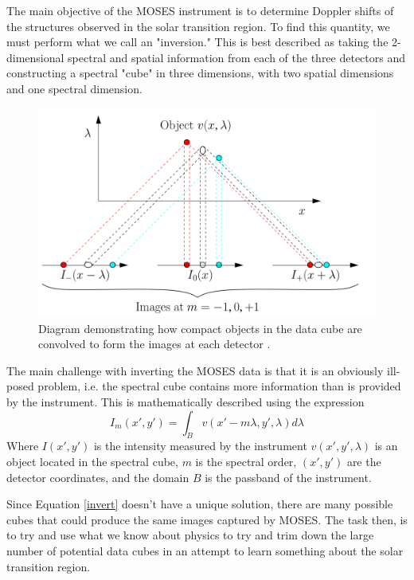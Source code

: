 \documentclass[twoside]{article}
\begin{document}
\begin{multicols}{2}
\begin{figure}[H]
\end{figure}
The main objective of the MOSES instrument is to determine Doppler shifts of the structures observed in the solar transition region. To find this quantity, we must perform what we call an "inversion." This is best described as taking the 2-dimensional spectral and spatial information from each of the three detectors and constructing a spectral "cube" in three dimensions, with two spatial dimensions and one spectral dimension.
\begin{figure}[H]
	\includegraphics[width=\linewidth]{images/inversion}
	\caption{Diagram demonstrating how compact objects in the data cube are convolved to form the images at each detector \cite{moses}.}
\end{figure}
The main challenge with inverting the MOSES data is that it is an obviously ill-posed problem, i.e. the spectral cube contains more information than is provided by the instrument. This is mathematically described using the expression
\begin{equation}
I_m(x',y') = \int_B v(x'-m \lambda,y',\lambda)d\lambda \label{invert}
\end{equation}
Where $I(x',y')$ is the intensity measured by the instrument $v(x',y',\lambda)$ is an object located in the spectral cube, $m$ is the spectral order, $(x',y')$ are the detector coordinates, and the domain $B$ is the passband of the instrument. 
\par Since Equation \eqref{invert} doesn't have a unique solution, there are many possible cubes that could produce the same images captured by MOSES. The task then, is to try and use what we know about physics to try and trim down the large number of potential data cubes in an attempt to learn something about the solar transition region. \par 


\end{multicols}
\end{document}
